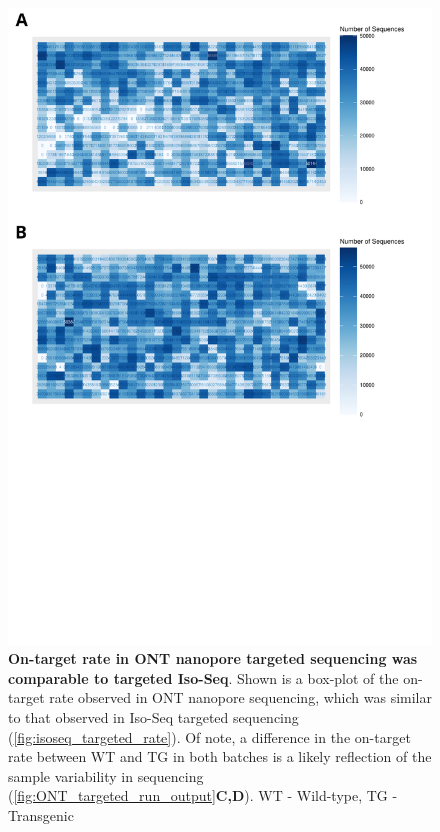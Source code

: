 \begin{figure}[]
	\centering
	\includegraphics[page=5,trim={0 27cm 0 0cm},clip,scale = 0.5]{Figures/ONTTargetedTranscriptome.pdf}
	\captionsetup{width=0.95\textwidth}
	\caption[On-Target rate in ONT nanopore runs]%
	{\textbf{On-target rate in ONT nanopore targeted sequencing was comparable to targeted Iso-Seq}. Shown is a box-plot of the on-target rate observed in ONT nanopore sequencing, which was similar to that observed in Iso-Seq targeted sequencing (\cref{fig:isoseq_targeted_rate}). Of note, a difference in the on-target rate between WT and TG in both batches is a likely reflection of the sample variability in sequencing (\cref{fig:ONT_targeted_run_output}\textbf{C,D}). WT - Wild-type, TG - Transgenic}
	\label{fig:ont_targeted_rate}
\end{figure}

